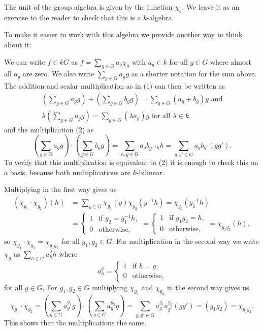 The unit of the group algebra is given by the function $\chi_e$. We leave it as an exercise to the reader to check that this is a $k$-algebra.

To make it easier to work with this algebra we provide another way to think about it:

We can write $f \in kG$ as $f = \sum_{g \in G} a_g \chi_g$ with $a_g \in k$ for all $g \in G$ where almost all $a_g$ are zero. We also write $\sum_{g \in G} a_g g$ as a shorter notation for the sum above. The addition and scalar multiplication as in (1) can then be written as
\begin{gather*}
 \left( \sum_{g \in G} a_g g \right) + \left( \sum_{g \in G} b_g g \right) = \sum_{g \in G} (a_g+b_g) g \text{ and}\\
 \lambda \left( \sum_{g \in G} a_g g \right) = \sum_{g \in G} (\lambda a_g) g \text{ for all } \lambda \in k
\end{gather*}
and the multiplication (2) as
\[
 \left( \sum_{g \in G} a_g g \right) \cdot \left( \sum_{g \in G} b_g g \right)
 = \sum_{h, g \in G} a_g b_{g^{-1}h} h
 = \sum_{g, g' \in G} a_g b_{g'} (g g').
\]
To verify that this multiplication is equivalent to (2) it is enough to check this on a basis, because both multiplications are $k$-bilinear.

Multiplying in the first way gives us
\begin{align*}
 \left( \chi_{g_1} \cdot \chi_{g_2} \right)(h)
 &= \sum_{y \in G} \chi_{g_1}(y) \chi_{g_2}\left(y^{-1} h\right)
 = \chi_{g_2}\left(g_1^{-1}h\right) \\
 &= \begin{cases} 1 & \text{if } g_2 = g_1^{-1}h, \\ 0 & \text{otherwise}, \end{cases}
 = \begin{cases} 1 & \text{if } g_1 g_2 = h, \\ 0 & \text{otherwise}, \end{cases}
 = \chi_{g_1 g_2}(h),
\end{align*}
so $\chi_{g_1} \cdot \chi_{g_2} = \chi_{g_1 g_2}$ for all $g_1, g_2 \in G$.
For multiplication in the second way we write $\chi_g$ as $\sum_{h \in G} a^g_h h$ where
\[
 a^g_h = \begin{cases} 1 & \text{if } h = g, \\ 0 & \text{otherwise}, \end{cases}
\]
for all $g \in G$. For $g_1, g_2 \in G$ multiplying $\chi_{g_1}$ and $\chi_{g_2}$ in the second way gives us
\[
 \chi_{g_1} \cdot \chi_{g_2}
 = \left( \sum_{g \in G} a^{g_1}_g g \right) \cdot \left( \sum_{g \in G} a^{g_2}_g g \right)
 = \sum_{g,g' \in G} a^{g_1}_g a^{g_2}_{g'} (g g')
 = (g_1 g_2)
 = \chi_{g_1 g_2}.
\]
This shows that the multiplications the same.

